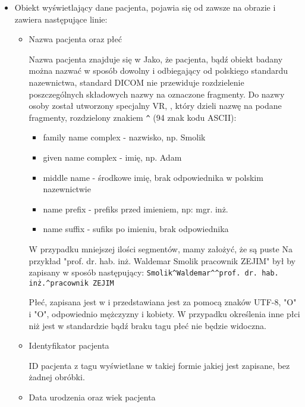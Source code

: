 \begin{itemize}

    \item {}

    Obiekt wyświetlający dane pacjenta, pojawia się od zawsze na obrazie i zawiera następujące linie:

    \begin{itemize}
        \item Nazwa pacjenta oraz płeć

        Nazwa pacjenta znajduje się w 
        Jako, że pacjenta, bądź obiekt badany można nazwać w sposób dowolny i odbiegający od polskiego standardu nazewnictwa, standard DICOM nie przewiduje rozdzielenie poszczególnych składowych nazwy na oznaczone fragmenty.
        Do nazwy osoby został utworzony specjalny VR, , który dzieli nazwę na podane fragmenty, rozdzielony znakiem \texttt{\^{}} (94 znak kodu ASCII):
        \begin{itemize}
            \item family name complex - nazwisko, np. Smolik
            \item given name complex - imię, np. Adam
            \item middle name - środkowe imię, brak odpowiednika w polskim nazewnictwie
            \item name prefix - prefiks przed imieniem, np: mgr. inż.
            \item name suffix - sufiks po imieniu, brak odpowiednika
        \end{itemize}
        W przypadku mniejszej ilości segmentów, mamy założyć, że są puste
        Na przykład "prof. dr. hab. inż. Waldemar Smolik pracownik ZEJIM" był by zapisany w sposób następujący: \texttt{Smolik\^{}Waldemar\^{}\^{}prof. dr. hab. inż.\^{}pracownik ZEJIM}

        Płeć, zapisana jest w  i przedstawiana jest za pomocą znaków UTF-8, "O" i "O", odpowiednio mężczyzny i kobiety.
        W przypadku określenia inne płci niż jest w standardzie bądź braku tagu płeć nie będzie widoczna.

        \item Identyfikator pacjenta

        ID pacjenta z tagu  wyświetlane w takiej formie jakiej jest zapisane, bez żadnej obróbki.

        \item Data urodzenia oraz wiek pacjenta


\end{itemize}
\end{itemize}
